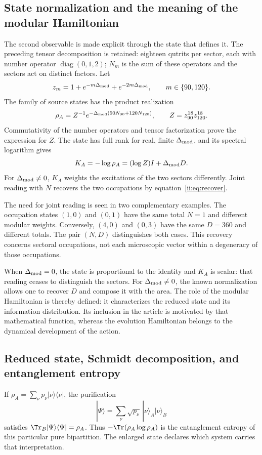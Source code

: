 \subsection{State normalization and the meaning of the modular Hamiltonian}
The second observable is made explicit through the state that defines it.
The preceding tensor decomposition is retained: eighteen qutrits
per sector, each with number operator $\operatorname{diag}(0,1,2)$;
$N_m$ is the sum of these operators and the sectors act on distinct
factors. Let
\[
 z_m=1+e^{-m\Delta_{\rm mod}}+e^{-2m\Delta_{\rm mod}},
 \qquad m\in\{90,120\}.
\]
The family of source states has the product realization
\[
 \rho_A=Z^{-1}e^{-\Delta_{\rm mod}(90N_{90}+120N_{120})},
 \qquad Z=z_{90}^{18}z_{120}^{18}.
\]
Commutativity of the number operators and tensor factorization
prove the expression for $Z$. The state has full rank for
real, finite $\Delta_{\rm mod}$, and its spectral logarithm gives
\[
 K_A=-\log\rho_A=(\log Z)I+\Delta_{\rm mod}D.
\]
For $\Delta_{\rm mod}\ne0$, $K_A$ weights the excitations
of the two sectors differently. Joint reading with $N$ recovers the two occupations
by equation~\eqref{ii:eq:recover}.

The need for joint reading is seen in two complementary examples.
The occupation states $(1,0)$ and $(0,1)$ have the same total $N=1$
and different modular weights. Conversely, $(4,0)$ and $(0,3)$ have
the same $D=360$ and different totals. The pair $(N,D)$ distinguishes both
cases. This recovery concerns sectoral occupations, not
each microscopic vector within a degeneracy of those occupations.

When $\Delta_{\rm mod}=0$, the state is proportional to the identity
and $K_A$ is scalar: that reading ceases to distinguish the sectors.
For $\Delta_{\rm mod}\ne0$, the known normalization allows one to recover
$D$ and compose it with the area. The role of the modular Hamiltonian
is thereby defined: it characterizes the reduced state and its information distribution.
Its inclusion in the article is motivated by that mathematical function,
whereas the evolution Hamiltonian belongs to the dynamical development
of the action.



\subsection{Reduced state, Schmidt decomposition, and entanglement entropy}
If $\rho_A=\sum_\nu p_\nu|\nu\rangle\langle\nu|$,
the purification
\[
|\Psi\rangle=\sum_\nu\sqrt{p_\nu}\,
|\nu\rangle_A|\nu\rangle_B
\]
satisfies $\Tr_B|\Psi\rangle\langle\Psi|=\rho_A$.
Thus $-\Tr(\rho_A\log\rho_A)$ is the entanglement entropy
of this particular pure bipartition. The enlarged state declares
which system carries that interpretation.

